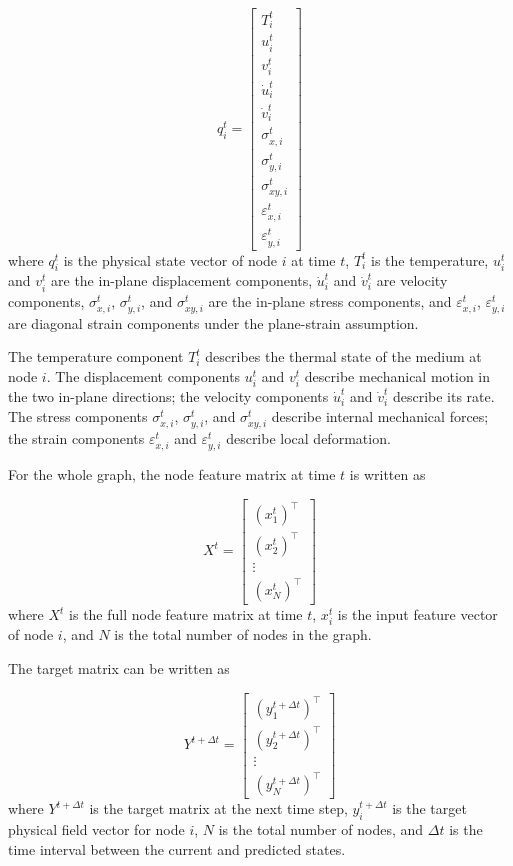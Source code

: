 \begin{equation}
q_i^t =
\begin{bmatrix}
T_i^t \\
u_i^t \\
v_i^t \\
\dot{u}_i^t \\
\dot{v}_i^t \\
\sigma_{x,i}^t \\
\sigma_{y,i}^t \\
\sigma_{xy,i}^t \\
\varepsilon_{x,i}^t \\
\varepsilon_{y,i}^t
\end{bmatrix}
\end{equation}
where \(q_i^t\) is the physical state vector of node \(i\) at time \(t\), \(T_i^t\) is the temperature, \(u_i^t\) and \(v_i^t\) are the in-plane displacement components, \(\dot{u}_i^t\) and \(\dot{v}_i^t\) are velocity components, \(\sigma_{x,i}^t\), \(\sigma_{y,i}^t\), and \(\sigma_{xy,i}^t\) are the in-plane stress components, and \(\varepsilon_{x,i}^t\), \(\varepsilon_{y,i}^t\) are diagonal strain components under the plane-strain assumption.

The temperature component \(T_i^t\) describes the thermal state of the medium at node \(i\). The displacement components \(u_i^t\) and \(v_i^t\) describe mechanical motion in the two in-plane directions; the velocity components \(\dot{u}_i^t\) and \(\dot{v}_i^t\) describe its rate. The stress components \(\sigma_{x,i}^t\), \(\sigma_{y,i}^t\), and \(\sigma_{xy,i}^t\) describe internal mechanical forces; the strain components \(\varepsilon_{x,i}^t\) and \(\varepsilon_{y,i}^t\) describe local deformation.

For the whole graph, the node feature matrix at time \(t\) is written as

\begin{equation}
X^{t}
=
\begin{bmatrix}
(x_1^t)^{\top} \\
(x_2^t)^{\top} \\
\vdots \\
(x_N^t)^{\top}
\end{bmatrix}
\end{equation}
where \(X^{t}\) is the full node feature matrix at time \(t\), \(x_i^t\) is the input feature vector of node \(i\), and \(N\) is the total number of nodes in the graph.

The target matrix can be written as

\begin{equation}
Y^{t+\Delta t}
=
\begin{bmatrix}
(y_1^{t+\Delta t})^{\top} \\
(y_2^{t+\Delta t})^{\top} \\
\vdots \\
(y_N^{t+\Delta t})^{\top}
\end{bmatrix}
\end{equation}
where \(Y^{t+\Delta t}\) is the target matrix at the next time step, \(y_i^{t+\Delta t}\) is the target physical field vector for node \(i\), \(N\) is the total number of nodes, and \(\Delta t\) is the time interval between the current and predicted states.

